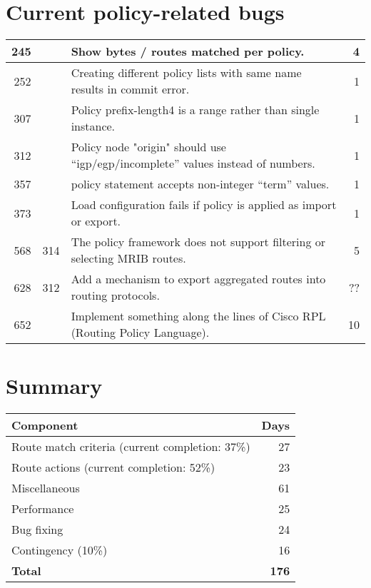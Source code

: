 \documentclass[letterpaper]{article}
\begin{document}
\section{Current policy-related bugs}
\begin{center}
\tabletail{
\hline
}
\begin{supertabular}{|r |r |p{10cm} |r|}
\hline

245 &  
& Show bytes / routes matched per policy.
& 4 \\
\hline

252 &  
& Creating different policy lists with same name results in commit
error. 
& 1 \\
\hline

307 &  
& Policy prefix-length4 is a range rather than single instance.
& 1 \\
\hline

312 & 
& Policy node "origin" should use ``igp/egp/incomplete'' values instead of
numbers.
& 1 \\
\hline

357 & 
& policy statement accepts non-integer ``term'' values.
& 1 \\
\hline

373 & 
& Load configuration fails if policy is applied as import or export.
& 1 \\
\hline

568 & 314
& The policy framework does not support filtering or selecting MRIB routes.
& 5 \\
\hline

628 & 312
&   	Add a mechanism to export aggregated routes into routing protocols.
& ?? \\
\hline

652 & 
& Implement something along the lines of Cisco RPL (Routing Policy Language).
& 10 \\
\hline

\end{supertabular}
\end{center}

\section{Summary}
\begin{center}
\begin{tabular}{|l |r|}
\hline
Component	& Days \\
\hline
Route match criteria (current completion: 37\%)	& 27 \\
Route actions (current completion: 52\%)	& 23 \\
\hline
Miscellaneous		& 61 \\
Performance		& 25 \\
\hline
Bug fixing		& 24 \\
\hline
Contingency (10\%)	& 16 \\
\hline
\hline
{\bf Total}		& {\bf 176} \\
\hline

\end{tabular}
\end{center}
\end{document}
